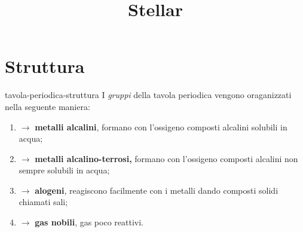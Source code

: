 \documentclass[preview]{standalone}
\begin{document}
\title{Stellar}
\genpage


\section{Struttura}

\begin{snippet}{tavola-periodica-struttura}
    I \textit{gruppi} della tavola periodica vengono oraganizzati nella seguente maniera:
    \begin{enumerate}[label=\textbf{\Roman*}]
        \item $\rightarrow$ \textbf{metalli alcalini}, formano con l'ossigeno composti alcalini solubili in acqua;
        \item $\rightarrow$ \textbf{metalli alcalino-terrosi,} formano con l'ossigeno composti alcalini non
            sempre solubili in acqua;
        \item $\rightarrow$ \textbf{alogeni}, reagiscono facilmente con i metalli dando composti solidi chiamati sali;
        \item $\rightarrow$ \textbf{gas nobili}, gas poco reattivi.
    \end{enumerate}
    \vspace{.5cm}
\end{snippet}
\end{document}
